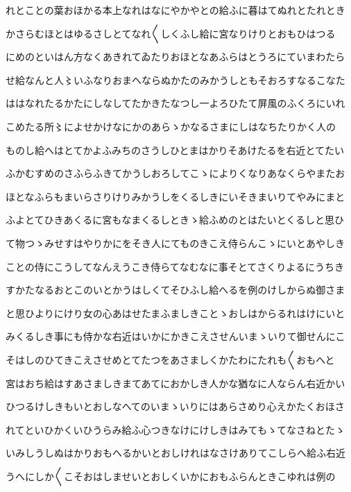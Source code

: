 \documentclass[a4paper,11pt,landscape]{ltjtarticle}
\begin{document}
\par\medskip
れとことの葉おほかる本上なれはなにやかやとの給ふに暮はてぬれとたれとき
\par\medskip
かさらむほとはゆるさしとてなれ〱しくふし給に宮なりけりとおもひはつる
\par\medskip
にめのといはん方なくあきれてゐたりおほとなあふらはとうろにていまわたら
\par\medskip
せ給なんと人〻いふなりおまへならぬかたのみかうしともそおろすなるこなた
\par\medskip
ははなれたるかたにしなしてたかきたなつし一よろひたて屏風のふくろにいれ
\par\medskip
こめたる所〻によせかけなにかのあらゝかなるさまにしはなちたりかく人の
\par\medskip
ものし給へはとてかよふみちのさうしひとまはかりそあけたるを右近とてたい
\par\medskip
ふかむすめのさふらふきてかうしおろしてこゝによりくなりあなくらやまたお
\par\medskip
ほとなふらもまいらさりけりみかうしをくるしきにいそきまいりてやみにまと
\par\medskip
ふよとてひきあくるに宮もなまくるしときゝ給ふめのとはたいとくるしと思ひ
\par\medskip
て物つゝみせすはやりかにをそき人にてものきこえ侍らんこゝにいとあやしき
\par\medskip
ことの侍にこうしてなんえうこき侍らてなむなに事そとてさくりよるにうちき
\par\medskip
すかたなるおとこのいとかうはしくてそひふし給へるを例のけしからぬ御さま
\par\medskip
と思ひよりにけり女の心あはせたまふましきことゝおしはからるれはけにいと
\par\medskip
みくるしき事にも侍かな右近はいかにかきこえさせんいまゝいりて御せんにこ
\par\medskip
そはしのひてきこえさせめとてたつをあさましくかたわにたれも〱おもへと
\par\medskip
宮はおち給はすあさましきまてあてにおかしき人かな猶なに人ならん右近かい
\par\medskip
ひつるけしきもいとおしなへてのいまゝいりにはあらさめり心えかたくおほさ
\par\medskip
れてといひかくいひうらみ給ふ心つきなけにけしきはみてもゝてなさねとたゝ
\par\medskip
いみしうしぬはかりおもへるかいとおしけれはなさけありてこしらへ給ふ右近
\par\medskip
うへにしか〱こそおはしませいとおしくいかにおもふらんときこゆれは例の
\par\medskip
\end{document}
